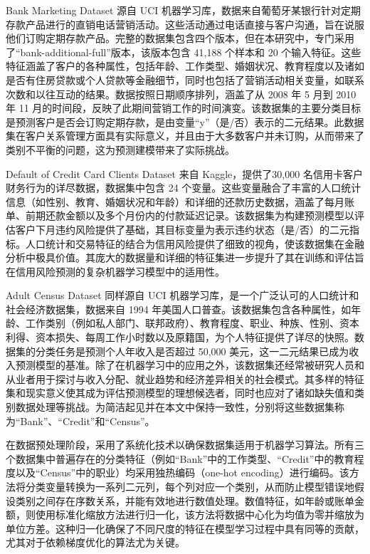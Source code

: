 Bank Marketing Dataset 源自 UCI 机器学习库，数据来自葡萄牙某银行针对定期存款产品进行的直销电话营销活动。这些活动通过电话直接与客户沟通，旨在说服他们订购定期存款产品。完整的数据集包含四个版本，但在本研究中，专门采用了“bank-additional-full”版本，该版本包含 41,188 个样本和 20 个输入特征。这些特征涵盖了客户的各种属性，包括年龄、工作类型、婚姻状况、教育程度以及诸如是否有住房贷款或个人贷款等金融细节，同时也包括了营销活动相关变量，如联系次数和以往互动的结果。数据按照日期顺序排列，涵盖了从 2008 年 5 月到 2010 年 11 月的时间段，反映了此期间营销工作的时间演变。该数据集的主要分类目标是预测客户是否会订购定期存款，是由变量“y”（是/否）表示的二元结果。此数据集在客户关系管理方面具有实际意义，并且由于大多数客户并未订购，从而带来了类别不平衡的问题，这为预测建模带来了实际挑战。

Default of Credit Card Clients Dataset 来自 Kaggle，提供了30,000 名信用卡客户财务行为的详尽数据，数据集中包含 24 个变量。这些变量融合了丰富的人口统计信息（如性别、教育、婚姻状况和年龄）和详细的还款历史数据，涵盖了每月账单、前期还款金额以及多个月份内的付款延迟记录。该数据集为构建预测模型以评估客户下月违约风险提供了基础，其目标变量为表示违约状态（是/否）的二元指标。人口统计和交易特征的结合为信用风险提供了细致的视角，使该数据集在金融分析中极具价值。其庞大的数据量和详细的特征集进一步提升了其在训练和评估旨在信用风险预测的复杂机器学习模型中的适用性。

Adult Census Dataset 同样源自 UCI 机器学习库，是一个广泛认可的人口统计和社会经济数据集，数据来自 1994 年美国人口普查。该数据集包含各种属性，如年龄、工作类别（例如私人部门、联邦政府）、教育程度、职业、种族、性别、资本利得、资本损失、每周工作小时数以及原籍国，为个人特征提供了详尽的快照。数据集的分类任务是预测个人年收入是否超过 50,000 美元，这一二元结果已成为收入预测模型的基准。除了在机器学习中的应用之外，该数据集还经常被研究人员和从业者用于探讨与收入分配、就业趋势和经济差异相关的社会模式。其多样的特征集和现实意义使其成为评估预测模型的理想候选者，同时也应对了诸如缺失值和类别数据处理等挑战。为简洁起见并在本文中保持一致性，分别将这些数据集称为“Bank”、“Credit”和“Census”。

在数据预处理阶段，采用了系统化技术以确保数据集适用于机器学习算法。所有三个数据集中普遍存在的分类特征（例如“Bank”中的工作类型、“Credit”中的教育程度以及“Census”中的职业）均采用独热编码（one-hot encoding）进行编码。该方法将分类变量转换为一系列二元列，每个列对应一个类别，从而防止模型错误地假设类别之间存在序数关系，并能有效地进行数值处理。数值特征，如年龄或账单金额，则使用标准化缩放方法进行归一化，该方法将数据中心化为均值为零并缩放为单位方差。这种归一化确保了不同尺度的特征在模型学习过程中具有同等的贡献，尤其对于依赖梯度优化的算法尤为关键。

